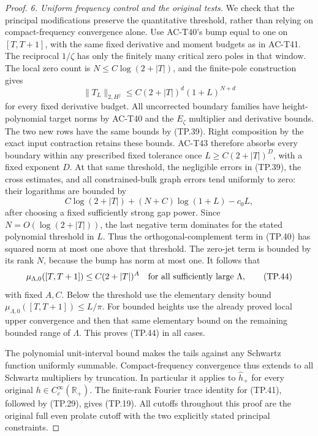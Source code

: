 \begin{proof}
\emph{6. Uniform frequency control and the original tests.}
We check that the principal modifications preserve
the quantitative threshold, rather than relying
on compact-frequency convergence alone.
Use AC-T40's bump equal to one on \([T,T+1]\),
with the same fixed derivative and moment budgets
as in AC-T41.  The reciprocal \(1/\zeta\) has
only the finitely many critical zero poles in
that window.  The local zero count is
\(N\leq C\log(2+|T|)\), and the finite-pole
construction gives
\[
       \|T_L\|_{2,H^j}
          \leq C(2+|T|)^d(1+L)^{N+d}
 \tag{TP.42}
\]
for every fixed derivative budget.
All uncorrected boundary families have
height-polynomial target norms by AC-T40 and
the \(E_\zeta\) multiplier and derivative bounds.
The two new rows have the same bounds by
(TP.39).  Right composition by the exact input
contraction retains these bounds.
AC-T43 therefore absorbs every boundary within
any prescribed fixed tolerance once
\(L\geq C(2+|T|)^D\), with a fixed exponent \(D\).
At that same threshold, the negligible errors
in (TP.39), the cross estimates, and all
constrained-bulk graph errors tend uniformly
to zero: their logarithms are bounded by
\[
       C\log(2+|T|)+(N+C)\log(1+L)-c_0L ,
 \tag{TP.43}
\]
after choosing a fixed sufficiently strong gap
power.  Since \(N=O(\log(2+|T|))\), the last
negative term dominates for the stated polynomial
threshold in \(L\).
Thus the orthogonal-complement term in (TP.40)
has squared norm at most one above that threshold.
The zero-jet term is bounded by its rank \(N\),
because the bump has norm at most one.
It follows that
\[
 \mu_{\Lambda,0}([T,T+1])
       \leq C(2+|T|)^A
              \quad\hbox{for all sufficiently large }\Lambda,
 \tag{TP.44}
\]
with fixed \(A,C\).
Below the threshold use the elementary density
bound \(\mu_{\Lambda,0}([T,T+1])\leq L/\pi\).
For bounded heights use the already proved local
upper convergence and then that same elementary
bound on the remaining bounded range of \(\Lambda\).
This proves (TP.44) in all cases.

The polynomial unit-interval bound makes the
tails against any Schwartz function uniformly
summable.  Compact-frequency convergence thus
extends to all Schwartz multipliers by truncation.
In particular it applies to \(\widehat h_+\)
for every original \(h\in C_c^\infty(\mathbb R_+)\).
The finite-rank Fourier trace identity for
(TP.41), followed by (TP.29), gives (TP.19).
All cutoffs throughout this proof are the original
full even prolate cutoff with the two explicitly
stated principal constraints.
\end{proof}

